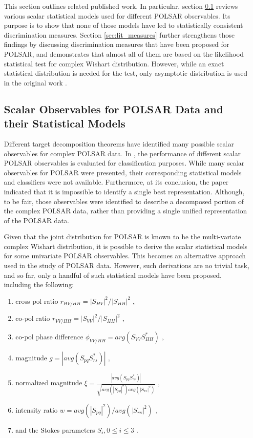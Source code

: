 \documentclass[journal]{IEEEtran}
\begin{document}
This section outlines related published work.
In particular, section \ref{sec:lit_models} reviews various scalar statistical models used for different POLSAR observables.
Its purpose is to show that none of those  models have led to statistically consistent discrimination measures. 
Section \ref{sec:lit_measures} further strengthens those findings by discussing discrimination measures that have been proposed for POLSAR,
  and demonstrates that almost all of them are based on the likelihood statistical test for complex Wishart distribution.
However, while an exact statistical distribution is needed for the test,
  only asymptotic distribution is used in the original work \cite{Conradsen_2003_TGRS_4}.
  
\subsection{Scalar Observables for POLSAR Data and their Statistical Models}
\label{sec:lit_models}

Different target decomposition theorems have identified many possible scalar observables for complex POLSAR data.
In \cite{Alberga_2008_IJRS_4129}, the performance of different scalar POLSAR observables is evaluated for classification purposes.
While many scalar observables for POLSAR were presented, their corresponding statistical models and classifiers were not available.
Furthermore, at its conclusion, the paper indicated that it is impossible to identify a single best representation.
Although, to be fair, those observables were identified to describe a decomposed portion of the complex POLSAR data,
  rather than providing a single unified representation of the POLSAR data.

Given that the joint distribution for POLSAR is known to be the multi-variate complex Wishart distribution,
  it is possible to derive the scalar statistical models for some univariate POLSAR observables.
This becomes an alternative approach used in the study of POLSAR data.
However, such derivations are no trivial task, and so far, only a handful of such statistical models have been proposed, including the following:
  \begin{enumerate}
  \item cross-pol ratio $r_{HV/HH} = |S_{HV}|^2/|S_{HH}|^2$ \cite{Joughin_1994_TGRS_562},
  \item co-pol ratio $r_{VV/HH} = |S_{VV}|^2/|S_{HH}|^2$ \cite{Joughin_1994_TGRS_562},
  \item co-pol phase difference $\phi_{VV/HH} = arg(S_{VV}S_{HH}^*) $ \cite{Joughin_1994_TGRS_562} \cite{Lee_1994_TGRS_1017},
  \item magnitude $g=|avg(S_{pq}S_{rs}^*)|$ \cite{Lee_1994_TGRS_1017},
  \item normalized magnitude $\xi = \frac{|avg(S_{pq}S_{rs}^*)|}{\sqrt{avg(|S_{pq}|^2) avg(|S_{rs}|^2)}}$ \cite{Lee_1994_TGRS_1017},
  \item intensity ratio $w = avg(|S_{pq}|^2)/avg(|S_{rs}|^2)$ \cite{Lee_1994_TGRS_1017},
  \item and the Stokes parameters $S_i,0 \leq i \leq 3$ \cite{Touzi_1996_TGRS_519}. 
  \end{enumerate}
\end{document}
